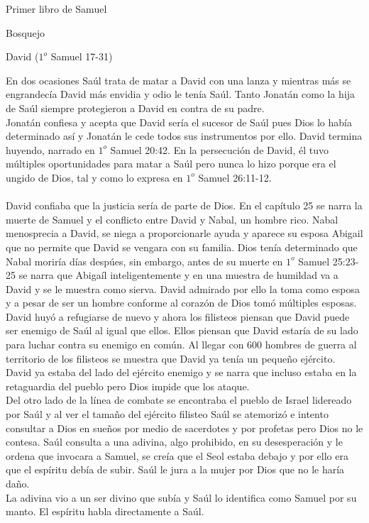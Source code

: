 \begin{section}{Primer libro de Samuel}
\begin{subsection}{Bosquejo}
\begin{subsubsection}{David ($1^{o}$ Samuel 17-31)}
\begin{enumerate}
					En dos ocasiones Saúl trata de matar a David con una lanza y mientras más se engrandecía David más envidia y odio le tenía Saúl. Tanto Jonatán como la hija de Saúl siempre protegieron a David en contra de su padre.\\
					Jonatán confiesa y acepta que David sería el sucesor de Saúl pues Dios lo había determinado así y Jonatán le cede todos sus instrumentos por ello. David termina huyendo, narrado en $1^{o}$ Samuel 20:42. En la persecución de David, él tuvo múltiples oportunidades para matar a Saúl pero nunca lo hizo porque era el ungido de Dios, tal y como lo expresa en $1^{o}$ Samuel 26:11-12.\\ \\
					David confiaba que la justicia sería de parte de Dios. En el capítulo 25 se narra la muerte de Samuel y el conflicto entre David y Nabal, un hombre rico. Nabal menosprecia a David, se niega a proporcionarle ayuda y aparece su esposa Abigail que no permite que David se vengara con su familia. Dios tenía determinado que Nabal moriría días despúes, sin embargo, antes de su muerte en $1^{o}$ Samuel 25:23-25 se narra que Abigaíl inteligentemente y en una muestra de humildad va a David y se le muestra como sierva.
					\newpage
					David admirado por ello la toma como esposa y a pesar de ser un hombre conforme al corazón de Dios tomó múltiples esposas. David huyó a refugiarse de nuevo y ahora los filisteos piensan que David puede ser enemigo de Saúl al igual que ellos. Ellos piensan que David estaría de su lado para luchar contra su enemigo en común. Al llegar con 600 hombres de guerra al territorio de los filisteos se muestra que David ya tenía un pequeño ejército. David ya estaba del lado del ejército enemigo y se narra que incluso estaba en la retaguardia del pueblo pero Dios impide que los ataque.\\
					Del otro lado de la línea de combate se encontraba el pueblo de Israel lidereado por Saúl y al ver el tamaño del ejército filisteo Saúl se atemorizó e intento consultar a Dios en sueños por medio de sacerdotes y por profetas pero Dios no le contesa. Saúl consulta a una adivina, algo prohibido, en su desesperación y le ordena que invocara a Samuel, se creía que el Seol estaba debajo y por ello era que el espíritu debía de subir. Saúl le jura a la mujer por Dios que no le haría daño.\\
					La adivina vio a un ser divino que subía y Saúl lo identifica como Samuel por su manto. El espíritu habla directamente a Saúl.\\

\end{enumerate}
\end{subsubsection}
\end{subsection}
\end{section}
